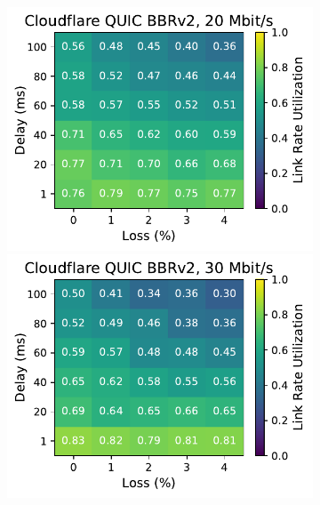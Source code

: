 \begin{figure}[ht]
\begin{subfigure}[b]{0.22\linewidth}
        \includegraphics[width=\linewidth,trim={0 0 2cm 0},clip]{splitting-paper/figures/heatmaps/heatmap_quiche_bbr2_20mbps.pdf}
        \includegraphics[width=\linewidth,trim={0 0 2cm 0},clip]{splitting-paper/figures/heatmaps/heatmap_quiche_bbr2_30mbps.pdf}

\end{subfigure}
\end{figure}
